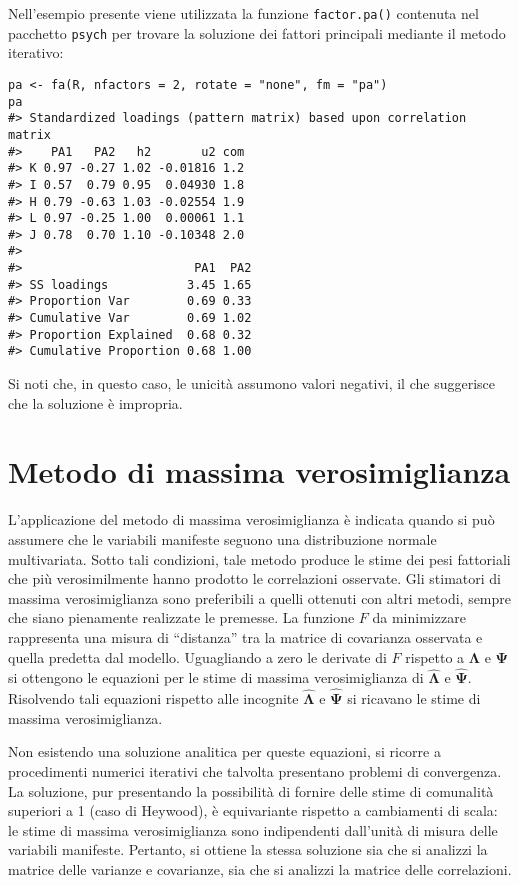 Nell'esempio presente viene utilizzata la funzione \texttt{factor.pa()} contenuta nel pacchetto \texttt{psych} per trovare la soluzione dei fattori principali mediante il metodo iterativo:
\begin{lstlisting}
pa <- fa(R, nfactors = 2, rotate = "none", fm = "pa")
pa
#> Standardized loadings (pattern matrix) based upon correlation matrix
#>    PA1   PA2   h2       u2 com
#> K 0.97 -0.27 1.02 -0.01816 1.2
#> I 0.57  0.79 0.95  0.04930 1.8
#> H 0.79 -0.63 1.03 -0.02554 1.9
#> L 0.97 -0.25 1.00  0.00061 1.1
#> J 0.78  0.70 1.10 -0.10348 2.0
#> 
#>                        PA1  PA2
#> SS loadings           3.45 1.65
#> Proportion Var        0.69 0.33
#> Cumulative Var        0.69 1.02
#> Proportion Explained  0.68 0.32
#> Cumulative Proportion 0.68 1.00
\end{lstlisting}
Si noti che, in questo caso, le unicità assumono valori negativi, il che suggerisce che la soluzione è impropria.


\section{Metodo di massima verosimiglianza}

L'applicazione del metodo di massima verosimiglianza è  indicata quando si può assumere che le variabili manifeste seguono una distribuzione 
normale multivariata.
  Sotto tali condizioni, tale metodo produce le stime dei pesi
  fattoriali che più verosimilmente hanno prodotto le correlazioni
  osservate.
  Gli stimatori di massima verosimiglianza sono preferibili a quelli ottenuti con altri metodi, sempre che siano pienamente realizzate le premesse.
La funzione $F$ da minimizzare rappresenta una misura di ``distanza''  tra la matrice di covarianza osservata e quella predetta dal modello.  
Uguagliando a zero le derivate di $F$ rispetto a $\boldsymbol{\Lambda}$ e $\boldsymbol{\Psi}$ si ottengono le equazioni per le stime di massima verosimiglianza di $\hat{\boldsymbol{\Lambda}}$ e $\hat{\boldsymbol{\Psi}}$. 
Risolvendo tali equazioni rispetto alle incognite $\hat{\boldsymbol{\Lambda}}$ e $\hat{\boldsymbol{\Psi}}$ si ricavano le stime di massima verosimiglianza. 

Non esistendo una soluzione  analitica per queste 
equazioni, si ricorre a procedimenti numerici iterativi che 
talvolta presentano problemi di convergenza.
  La soluzione, pur
presentando la possibilità di fornire delle stime di comunalità
superiori a 1 (caso di Heywood), è equivariante rispetto a cambiamenti
di scala: le stime di massima verosimiglianza sono indipendenti
dall'unità di misura delle variabili manifeste.
  Pertanto, si ottiene
la stessa soluzione sia che si analizzi la matrice delle varianze e
covarianze, sia che si analizzi la matrice delle correlazioni. 

